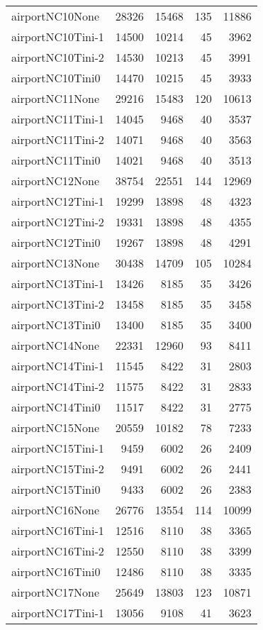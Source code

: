 \begin{longtable}{lrrrr}
airportNC10None & 28326 & 15468 & 135 & 11886 \\
airportNC10Tini-1 & 14500 & 10214 & 45 & 3962 \\
airportNC10Tini-2 & 14530 & 10213 & 45 & 3991 \\
airportNC10Tini0 & 14470 & 10215 & 45 & 3933 \\
airportNC11None & 29216 & 15483 & 120 & 10613 \\
airportNC11Tini-1 & 14045 & 9468 & 40 & 3537 \\
airportNC11Tini-2 & 14071 & 9468 & 40 & 3563 \\
airportNC11Tini0 & 14021 & 9468 & 40 & 3513 \\
airportNC12None & 38754 & 22551 & 144 & 12969 \\
airportNC12Tini-1 & 19299 & 13898 & 48 & 4323 \\
airportNC12Tini-2 & 19331 & 13898 & 48 & 4355 \\
airportNC12Tini0 & 19267 & 13898 & 48 & 4291 \\
airportNC13None & 30438 & 14709 & 105 & 10284 \\
airportNC13Tini-1 & 13426 & 8185 & 35 & 3426 \\
airportNC13Tini-2 & 13458 & 8185 & 35 & 3458 \\
airportNC13Tini0 & 13400 & 8185 & 35 & 3400 \\
airportNC14None & 22331 & 12960 & 93 & 8411 \\
airportNC14Tini-1 & 11545 & 8422 & 31 & 2803 \\
airportNC14Tini-2 & 11575 & 8422 & 31 & 2833 \\
airportNC14Tini0 & 11517 & 8422 & 31 & 2775 \\
airportNC15None & 20559 & 10182 & 78 & 7233 \\
airportNC15Tini-1 & 9459 & 6002 & 26 & 2409 \\
airportNC15Tini-2 & 9491 & 6002 & 26 & 2441 \\
airportNC15Tini0 & 9433 & 6002 & 26 & 2383 \\
airportNC16None & 26776 & 13554 & 114 & 10099 \\
airportNC16Tini-1 & 12516 & 8110 & 38 & 3365 \\
airportNC16Tini-2 & 12550 & 8110 & 38 & 3399 \\
airportNC16Tini0 & 12486 & 8110 & 38 & 3335 \\
airportNC17None & 25649 & 13803 & 123 & 10871 \\
airportNC17Tini-1 & 13056 & 9108 & 41 & 3623 \\

\end{longtable}
